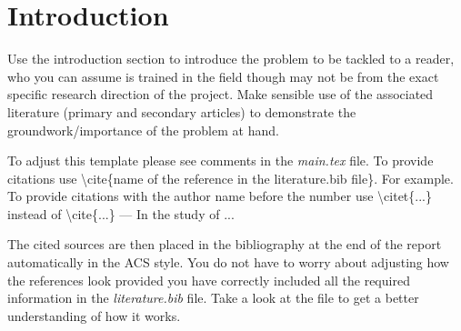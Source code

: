 \section{Introduction}
Use the introduction section to introduce the problem to be tackled to a reader, who you can assume is trained in the field though may not be from the exact specific research direction of the project. Make sensible use of the associated literature (primary and secondary articles) to demonstrate the groundwork/importance of the problem at hand.

To adjust this template please see comments in the \textit{main.tex} file. To provide citations use \textbackslash cite\{name of the reference in the literature.bib file\}. For example\cite{vogelpaper}. To provide citations with the author name before the number use \textbackslash citet\{...\} instead of \textbackslash cite\{...\} --- In the study of \citet{boccaccinipaper}...

The cited sources are then placed in the bibliography at the end of the report automatically in the ACS style. You do not have to worry about adjusting how the references look provided you have correctly included all the required information in the \textit{literature.bib} file. Take a look at the file to get a better understanding of how it works.
